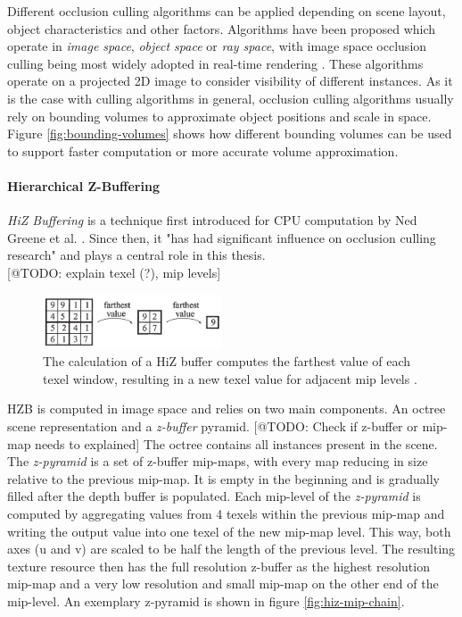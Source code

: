 \noindent
Different occlusion culling algorithms can be applied depending on scene layout, object characteristics and other 
factors. Algorithms have been proposed which operate in \emph{image space}, \emph{object space} or \emph{ray space}, 
with image space occlusion culling being most widely adopted in real-time rendering \cite{AkenineMoeller2018}. 
These algorithms operate on a projected 2D image to consider visibility of different instances. As it is the case 
with culling algorithms in general, occlusion culling algorithms usually rely on bounding volumes to approximate 
object positions and scale in space. Figure \ref{fig:bounding-volumes} shows how different bounding volumes can be 
used to support faster computation or more accurate volume approximation.

\paragraph*{Hierarchical Z-Buffering} \label{subsubsec-hierarchical-z-buffering}

\emph{\ac{HiZ} Buffering} is a technique first introduced for \ac{CPU} computation by Ned Greene et al. 
\cite{Greene93,Greene95}. Since then, it "has had significant influence on occlusion culling research" 
\cite{AkenineMoeller2018} and plays a central role in this thesis. \\

[@TODO: explain texel (?), mip levels]
\begin{figure}[h]
    \centering
    \includegraphics[width=200px]{images/graphics/hiz-buf-values.jpg}
    \caption{The calculation of a \ac{HiZ} buffer computes the farthest value of each texel window, 
    resulting in a new texel value for adjacent mip levels \cite{AkenineMoeller2018}.}
    \label{fig:hiz-value-computation}
\end{figure}

\noindent
\ac{HZB} is computed in image space and relies on two main components. An octree scene representation and a 
\emph{z-buffer} pyramid. [@TODO: Check if z-buffer or mip-map needs to explained] 
The octree contains all instances present in the scene. The \emph{z-pyramid} is a set of z-buffer mip-maps, with every 
map reducing in size relative to the previous mip-map. It is empty in the beginning and is gradually filled after the 
depth buffer is populated. Each mip-level of the \emph{z-pyramid} is computed by aggregating values from 4 texels within 
the previous mip-map and writing the output value into one texel of the new mip-map level. This way, both axes (u and v) 
are scaled to be half the length of the previous level. The resulting texture resource then has the full resolution 
z-buffer as the highest resolution mip-map and a very low resolution and small mip-map on the other end of the 
mip-level. An exemplary z-pyramid is shown in figure \ref{fig:hiz-mip-chain}.\\

